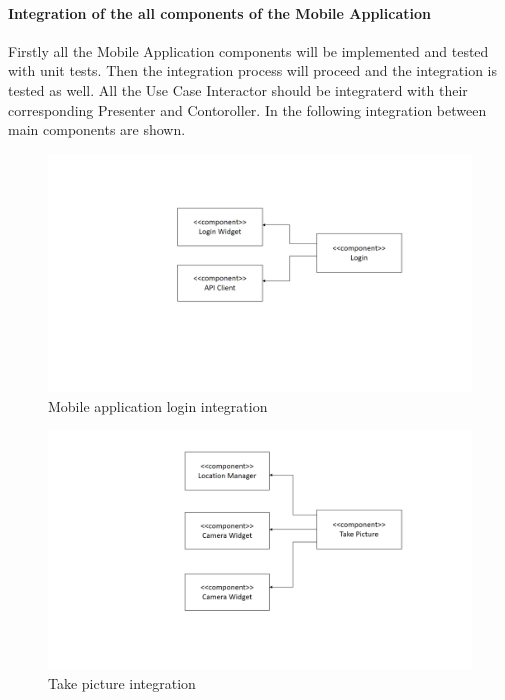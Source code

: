 \paragraph{Integration of the all components of the Mobile Application}
Firstly all the Mobile Application components will be implemented and tested with unit tests. Then the integration process will proceed and the integration is tested as well. All the Use Case Interactor should be integraterd with their corresponding Presenter and Contoroller. In the following integration between main components are shown.

\begin{figure}[H]
\centering
\includegraphics[width=\textwidth]{Images/LoginIntegration.png}
\caption{\label{fig:LoginIntegration} Mobile application login integration}
\end{figure}

\begin{figure}[H]
\centering
\includegraphics[width=\textwidth]{Images/TakePicIntegration.png}
\caption{\label{fig:TakePicIntegration} Take picture integration}
\end{figure}

